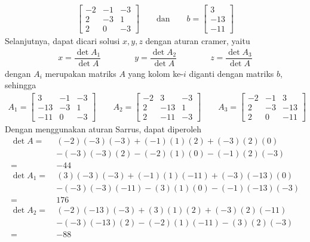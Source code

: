 \documentclass{article}
\begin{document}
\begin{enumerate}
\begin{align*}
\begin{bmatrix}
    -2 & -1 & -3\\
    2 & -3 & 1\\
    2 & 0 & -3 
    \end{bmatrix} \qquad \text{dan} \qquad b = \begin{bmatrix}
    3 \\ -13 \\ -11
    \end{bmatrix}
    \end{align*}
    Selanjutnya, dapat dicari solusi $x,y,z$ dengan aturan cramer, yaitu 
    \begin{align*}
    x = \dfrac{\det A_1}{\det A} \qquad \qquad y=\dfrac{\det A_2}{\det A} \qquad \qquad z=\dfrac{\det A_3}{\det A}
    \end{align*}
    dengan $A_i$ merupakan matriks $A$ yang kolom ke-$i$ diganti dengan matriks $b$, sehingga 
    \begin{align*}
    A_1 = \begin{bmatrix}
    3 & -1 & -3\\
    -13 & -3 & 1\\
    -11 & 0 & -3 
    \end{bmatrix} \qquad A_2 = \begin{bmatrix}
    -2 & 3 & -3\\
    2 & -13 & 1\\
    2 & -11 & -3 
    \end{bmatrix} \qquad A_3 = \begin{bmatrix}
    -2 & -1 & 3\\
    2 & -3 & -13\\
    2 & 0 & -11 
    \end{bmatrix}
    \end{align*}
    Dengan menggunakan aturan Sarrus, dapat diperoleh 
    \begin{align*}
    \det A =~ &(-2)(-3)(-3)+(-1)(1)(2)+(-3)(2)(0)\\
    &-(-3)(-3)(2)-(-2)(1)(0)-(-1)(2)(-3) \\
    = ~& -44\\
    \det A_1 = ~ &(3)(-3)(-3)+(-1)(1)(-11)+(-3)(-13)(0)\\
    &-(-3)(-3)(-11)-(3)(1)(0)-(-1)(-13)(-3)\\
    = ~&176\\
    \det A_2 = ~ &(-2)(-13)(-3)+(3)(1)(2)+(-3)(2)(-11)\\
    &-(-3)(-13)(2)-(-2)(1)(-11)-(3)(2)(-3)\\
    = ~& -88 \\

\end{align*}
\end{enumerate}
\end{document}
